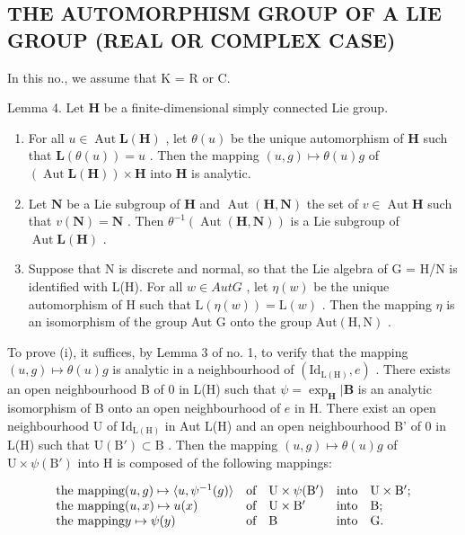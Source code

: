 \subsection{THE AUTOMORPHISM GROUP OF A LIE GROUP (REAL OR COMPLEX CASE)}

In this no., we assume that K = R or C.

Lemma 4. Let \(\mathbf{H}\) be a finite-dimensional simply connected Lie group.

\begin{enumerate}
\def\labelenumi{(\roman{enumi})}
\item
  For all \(u \in \operatorname{Aut} \mathbf{L}(\mathbf{H})\) , let \(\theta(u)\) be the unique automorphism of \(\mathbf{H}\) such that \(\mathbf{L}(\theta(u)) = u\) . Then the mapping \((u, g) \mapsto \theta(u)g\) of \((\operatorname{Aut} \mathbf{L}(\mathbf{H})) \times \mathbf{H}\) into \(\mathbf{H}\) is analytic.
\item
  Let \(\mathbf{N}\) be a Lie subgroup of \(\mathbf{H}\) and \(\operatorname{Aut}(\mathbf{H},\mathbf{N})\) the set of \(v\in \operatorname{Aut}\mathbf{H}\) such that \(v(\mathbf{N}) = \mathbf{N}\) . Then \(\theta^{-1}(\operatorname {Aut}(\mathbf{H},\mathbf{N}))\) is a Lie subgroup of \(\operatorname {Aut}\mathbf{L}(\mathbf{H})\) .
\item
  Suppose that N is discrete and normal, so that the Lie algebra of G = H/N is identified with L(H). For all \(w \in Aut G\) , let \(\eta(w)\) be the unique automorphism of H such that \(\mathrm{L}(\eta(w)) = \mathrm{L}(w)\) . Then the mapping \(\eta\) is an isomorphism of the group Aut G onto the group \(\mathrm{Aut}(\mathrm{H}, \mathrm{N})\) .
\end{enumerate}

To prove (i), it suffices, by Lemma 3 of no. 1, to verify that the mapping \((u,g)\mapsto\theta(u)g\) is analytic in a neighbourhood of \((\mathrm{Id}_{\mathrm{L(H)}},e)\) . There exists an open neighbourhood B of 0 in L(H) such that \(\psi = \exp_{\mathbf{H}}|\mathbf{B}\) is an analytic isomorphism of B onto an open neighbourhood of \(e\) in H. There exist an open neighbourhood U of \(\mathrm{Id}_{\mathrm{L(H)}}\) in Aut L(H) and an open neighbourhood B' of 0 in L(H) such that \(\mathrm{U(B')} \subset \mathrm{B}\) . Then the mapping \((u, g) \mapsto \theta(u)g\) of \(\mathrm{U} \times \psi(\mathrm{B'})\) into H is composed of the following mappings:

\[
\begin{array}{l l l l} \text {the mapping} (u, g) \mapsto \langle u, \psi^ {- 1} (g) \rangle & \text {of} & \mathrm{U} \times \psi (\mathrm{B} ^ {\prime}) & \text {into} \quad \mathrm{U} \times \mathrm{B} ^ {\prime}; \\ \text {the mapping} (u, x) \mapsto u (x) & \text {of} & \mathrm{U} \times \mathrm{B} ^ {\prime} & \text {into} \quad \mathrm{B}; \\ \text {the mapping} y \mapsto \psi (y) & \text {of} & \mathrm{B} & \text {into} \quad \mathrm{G}. \end{array}
\]

